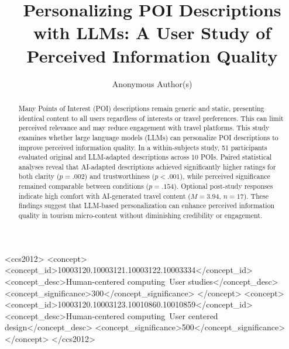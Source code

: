 \documentclass[sigconf,review,anonymous]{acmart}
\begin{document}
\title{Personalizing POI Descriptions with LLMs: A User Study of Perceived Information Quality}

\author{Anonymous Author(s)}

\renewcommand{\shortauthors}{Anonymous Author(s)}

\begin{abstract}
Many Points of Interest (POI) descriptions remain generic and static, presenting identical content to all users regardless of interests or travel preferences. This can limit perceived relevance and may reduce engagement with travel platforms. This study examines whether large language models (LLMs) can personalize POI descriptions to improve perceived information quality. In a within-subjects study, 51 participants evaluated original and LLM-adapted descriptions across 10 POIs. Paired statistical analyses reveal that AI-adapted descriptions achieved significantly higher ratings for both clarity ($p = .002$) and trustworthiness ($p < .001$), while perceived significance remained comparable between conditions ($p = .154$). Optional post-study responses indicate high comfort with AI-generated travel content ($M = 3.94$, $n = 17$). These findings suggest that LLM-based personalization can enhance perceived information quality in tourism micro-content without diminishing credibility or engagement.
\end{abstract}

\begin{CCSXML}
<ccs2012>
   <concept>
	<concept_id>10003120.10003121.10003122.10003334</concept_id>
	<concept_desc>Human-centered computing~User studies</concept_desc>
	<concept_significance>300</concept_significance>
	</concept>
	<concept>
	<concept_id>10003120.10003123.10010860.10010859</concept_id>
	<concept_desc>Human-centered computing~User centered design</concept_desc>
	<concept_significance>500</concept_significance>
	</concept>
 </ccs2012>
\end{CCSXML}
\end{document}
